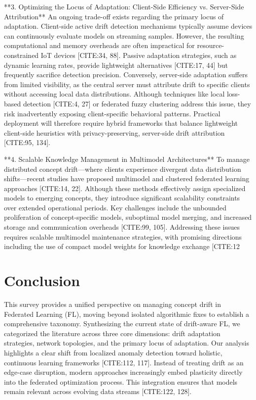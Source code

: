 \documentclass[journal]{IEEEtran}
\begin{document}
**3. Optimizing the Locus of Adaptation: Client-Side Efficiency vs. Server-Side Attribution**
An ongoing trade-off exists regarding the primary locus of adaptation. Client-side active drift detection mechanisms typically assume devices can continuously evaluate models on streaming samples. However, the resulting computational and memory overheads are often impractical for resource-constrained IoT devices [CITE:34, 88]. Passive adaptation strategies, such as dynamic learning rates, provide lightweight alternatives [CITE:17, 44] but frequently sacrifice detection precision. Conversely, server-side adaptation suffers from limited visibility, as the central server must attribute drift to specific clients without accessing local data distributions. Although techniques like local loss-based detection [CITE:4, 27] or federated fuzzy clustering \cite{Stallmann2024} address this issue, they risk inadvertently exposing client-specific behavioral patterns. Practical deployment will therefore require hybrid frameworks that balance lightweight client-side heuristics with privacy-preserving, server-side drift attribution [CITE:95, 134].

**4. Scalable Knowledge Management in Multimodel Architectures**
To manage distributed concept drift—where clients experience divergent data distribution shifts—recent studies have proposed multimodel and clustered federated learning approaches [CITE:14, 22]. Although these methods effectively assign specialized models to emerging concepts, they introduce significant scalability constraints over extended operational periods. Key challenges include the unbounded proliferation of concept-specific models, suboptimal model merging, and increased storage and communication overheads [CITE:99, 105]. Addressing these issues requires scalable multimodel maintenance strategies, with promising directions including the use of compact model weights for knowledge exchange [CITE:12

\section{Conclusion}
\label{sec:conclusion}

This survey provides a unified perspective on managing concept drift in Federated Learning (FL), moving beyond isolated algorithmic fixes to establish a comprehensive taxonomy. Synthesizing the current state of drift-aware FL, we categorized the literature across three core dimensions: drift adaptation strategies, network topologies, and the primary locus of adaptation. Our analysis highlights a clear shift from localized anomaly detection toward holistic, continuous learning frameworks [CITE:112, 117]. Instead of treating drift as an edge-case disruption, modern approaches increasingly embed plasticity directly into the federated optimization process. This integration ensures that models remain relevant across evolving data streams [CITE:122, 128].
\end{document}
